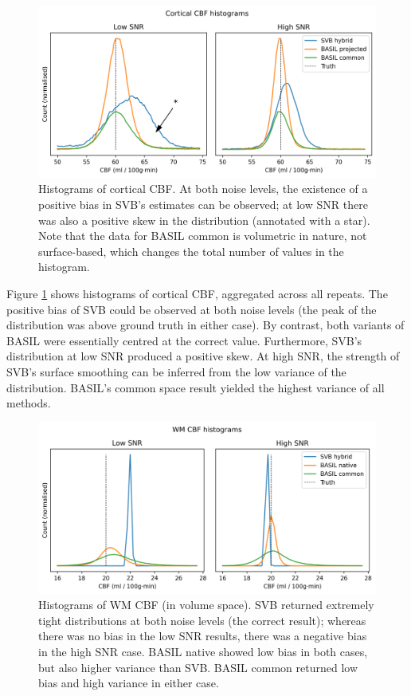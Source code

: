 \documentclass[12pt]{report}
\begin{document}
\begin{figure}[H]
\centering
\includegraphics[width=\textwidth]{cortex_cbf_hist.png}
\caption{Histograms of cortical CBF. At both noise levels, the existence of a positive bias in SVB's estimates can be observed; at low SNR there was also a positive skew in the distribution (annotated with a star). Note that the data for BASIL common is volumetric in nature, not surface-based, which changes the total number of values in the histogram.}
\label{cortex_cbf_hist} 
\end{figure}

Figure \ref{cortex_cbf_hist} shows histograms of cortical CBF, aggregated across all repeats. The positive bias of SVB could be observed at both noise levels (the peak of the distribution was above ground truth in either case). By contrast, both variants of BASIL were essentially centred at the correct value. Furthermore, SVB's distribution at low SNR produced a positive skew. At high SNR, the strength of SVB's surface smoothing can be inferred from the low variance of the distribution. BASIL's common space result yielded the highest variance of all methods. 

\begin{figure}[H]
\centering
\includegraphics[width=\textwidth]{wm_cbf_dist.png}
\caption{Histograms of WM CBF (in volume space). SVB returned extremely tight distributions at both noise levels (the correct result); whereas there was no bias in the low SNR results, there was a negative bias in the high SNR case. BASIL native showed low bias in both cases, but also higher variance than SVB. BASIL common returned low bias and high variance in either case.}
\label{wm_cbf_dist} 
\end{figure}
\end{document}
